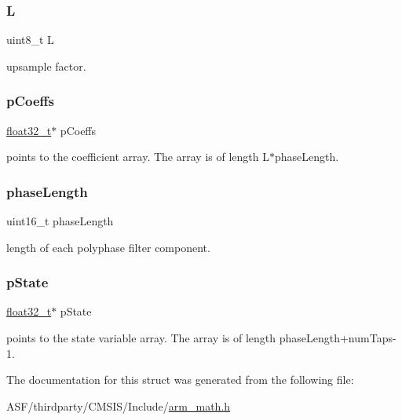 \subsubsection{\texorpdfstring{L}{L}}
{\footnotesize\ttfamily uint8\+\_\+t L}

upsample factor. \mbox{\label{structarm__fir__interpolate__instance__f32_aacbb8dd8eeba4b21fc2bb40076405ee3}} 
\subsubsection{\texorpdfstring{pCoeffs}{pCoeffs}}
{\footnotesize\ttfamily \mbox{\hyperlink{arm__math_8h_a4611b605e45ab401f02cab15c5e38715}{float32\+\_\+t}}$\ast$ p\+Coeffs}

points to the coefficient array. The array is of length L$\ast$phase\+Length. \mbox{\label{structarm__fir__interpolate__instance__f32_a8f92bb07e0812f94679438cdf412b26a}} 
\subsubsection{\texorpdfstring{phaseLength}{phaseLength}}
{\footnotesize\ttfamily uint16\+\_\+t phase\+Length}

length of each polyphase filter component. \mbox{\label{structarm__fir__interpolate__instance__f32_a335c87e6fdc4b96601d95a5de8b9c463}} 
\subsubsection{\texorpdfstring{pState}{pState}}
{\footnotesize\ttfamily \mbox{\hyperlink{arm__math_8h_a4611b605e45ab401f02cab15c5e38715}{float32\+\_\+t}}$\ast$ p\+State}

points to the state variable array. The array is of length phase\+Length+num\+Taps-\/1. 

The documentation for this struct was generated from the following file\+:\begin{DoxyCompactItemize}
\item 
A\+S\+F/thirdparty/\+C\+M\+S\+I\+S/\+Include/\mbox{\hyperlink{arm__math_8h}{arm\+\_\+math.\+h}}\end{DoxyCompactItemize}
